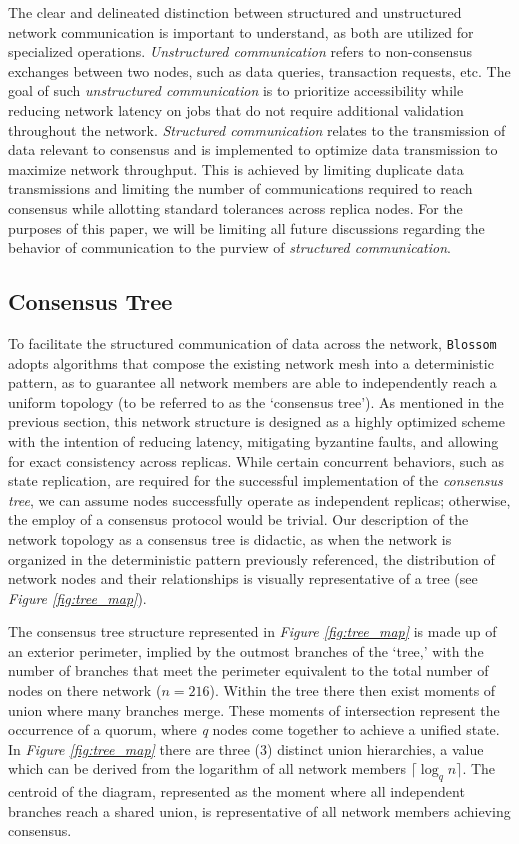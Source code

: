The clear and delineated distinction between structured and unstructured network communication is important to understand, as both are utilized for specialized operations. \textit{Unstructured communication} refers to non-consensus exchanges between two nodes, such as data queries, transaction requests, etc. The goal of such \textit{unstructured communication} is to prioritize accessibility while reducing network latency on jobs that do not require additional validation throughout the network. \textit{Structured communication} relates to the transmission of data relevant to consensus and is implemented to optimize data transmission to maximize network throughput. This is achieved by limiting duplicate data transmissions and limiting the number of communications required to reach consensus while allotting standard tolerances across replica nodes. For the purposes of this paper, we will be limiting all future discussions regarding the behavior of communication to the purview of \textit{structured communication}.

\subsection{Consensus Tree}\label{struc:con_tree}
To facilitate the structured communication of data across the network, \texttt{Blossom} adopts algorithms that compose the existing network mesh into a deterministic pattern, as to guarantee all network members are able to independently reach a uniform topology (to be referred to as the ‘consensus tree’). As mentioned in the previous section, this network structure is designed as a highly optimized scheme with the intention of reducing latency, mitigating byzantine faults, and allowing for exact consistency across replicas. While certain concurrent behaviors, such as state replication, are required for the successful implementation of the \textit{consensus tree}, we can assume nodes successfully operate as independent replicas; otherwise, the employ of a consensus protocol would be trivial. Our description of the network topology as a consensus tree is didactic, as when the network is organized in the deterministic pattern previously referenced, the distribution of network nodes and their relationships is visually representative of a tree (see \textit{Figure \ref{fig:tree_map}}).



The consensus tree structure represented in \textit{Figure \ref{fig:tree_map}} is made up of an exterior perimeter, implied by the outmost branches of the ‘tree,’ with the number of branches that meet the perimeter equivalent to the total number of nodes on there network (\(n=216\)). Within the tree there then exist moments of union where many branches merge. These moments of intersection represent the occurrence of a quorum, where \textit{q} nodes come together to achieve a unified state. In \textit{Figure \ref{fig:tree_map}} there are three (3) distinct union hierarchies, a value which can be derived from the logarithm of all network members \(\lceil \log_qn \rceil \). The centroid of the diagram, represented as the moment where all independent branches reach a shared union, is representative of all network members achieving consensus.


